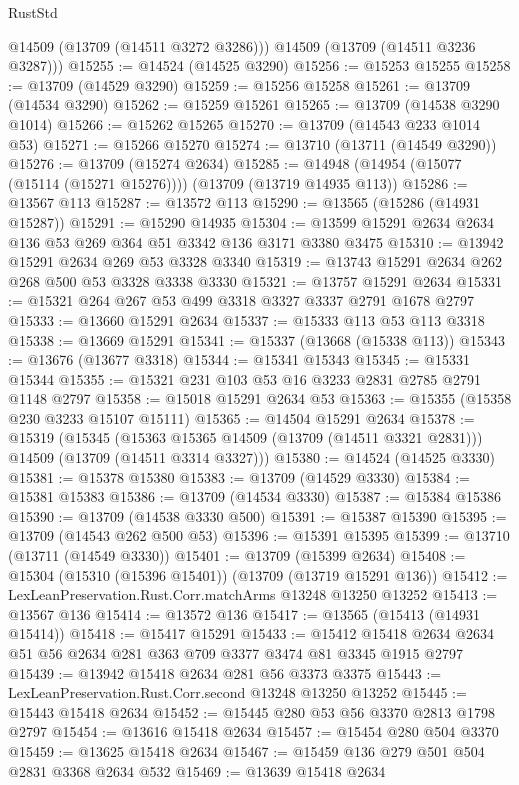 \begin{lexlean}{RustStd}
\begin{coremodule}
        @14509
        (@13709 (@14511 @3272 @3286)))
      @14509
      (@13709 (@14511 @3236 @3287)))
@15255 := @14524 (@14525 @3290)
@15256 := @15253 @15255
@15258 := @13709 (@14529 @3290)
@15259 := @15256 @15258
@15261 := @13709 (@14534 @3290)
@15262 := @15259 @15261
@15265 := @13709 (@14538 @3290 @1014)
@15266 := @15262 @15265
@15270 := @13709 (@14543 @233 @1014 @53)
@15271 := @15266 @15270
@15274 := @13710 (@13711 (@14549 @3290))
@15276 := @13709 (@15274 @2634)
@15285 := @14948 (@14954 (@15077 (@15114 (@15271 @15276)))) (@13709 (@13719 @14935 @113))
@15286 := @13567 @113
@15287 := @13572 @113
@15290 := @13565 (@15286 (@14931 @15287))
@15291 := @15290 @14935
@15304 := @13599 @15291 @2634 @2634 @136 @53 @269 @364 @51 @3342 @136 @3171 @3380 @3475
@15310 := @13942 @15291 @2634 @269 @53 @3328 @3340
@15319 := @13743 @15291 @2634 @262 @268 @500 @53 @3328 @3338 @3330
@15321 := @13757 @15291 @2634
@15331 := @15321 @264 @267 @53 @499 @3318 @3327 @3337 @2791 @1678 @2797
@15333 := @13660 @15291 @2634
@15337 := @15333 @113 @53 @113 @3318
@15338 := @13669 @15291
@15341 := @15337 (@13668 (@15338 @113))
@15343 := @13676 (@13677 @3318)
@15344 := @15341 @15343
@15345 := @15331 @15344
@15355 := @15321 @231 @103 @53 @16 @3233 @2831 @2785 @2791 @1148 @2797
@15358 := @15018 @15291 @2634 @53
@15363 := @15355 (@15358 @230 @3233 @15107 @15111)
@15365 := @14504 @15291 @2634
@15378 := @15319
    (@15345
      (@15363 @15365 @14509 (@13709 (@14511 @3321 @2831)))
      @14509
      (@13709 (@14511 @3314 @3327)))
@15380 := @14524 (@14525 @3330)
@15381 := @15378 @15380
@15383 := @13709 (@14529 @3330)
@15384 := @15381 @15383
@15386 := @13709 (@14534 @3330)
@15387 := @15384 @15386
@15390 := @13709 (@14538 @3330 @500)
@15391 := @15387 @15390
@15395 := @13709 (@14543 @262 @500 @53)
@15396 := @15391 @15395
@15399 := @13710 (@13711 (@14549 @3330))
@15401 := @13709 (@15399 @2634)
@15408 := @15304 (@15310 (@15396 @15401)) (@13709 (@13719 @15291 @136))
@15412 := LexLeanPreservation.Rust.Corr.matchArms @13248 @13250 @13252
@15413 := @13567 @136
@15414 := @13572 @136
@15417 := @13565 (@15413 (@14931 @15414))
@15418 := @15417 @15291
@15433 := @15412 @15418 @2634 @2634 @51 @56 @2634 @281 @363 @709 @3377 @3474 @81 @3345 @1915 @2797
@15439 := @13942 @15418 @2634 @281 @56 @3373 @3375
@15443 := LexLeanPreservation.Rust.Corr.second @13248 @13250 @13252
@15445 := @15443 @15418 @2634
@15452 := @15445 @280 @53 @56 @3370 @2813 @1798 @2797
@15454 := @13616 @15418 @2634
@15457 := @15454 @280 @504 @3370
@15459 := @13625 @15418 @2634
@15467 := @15459 @136 @279 @501 @504 @2831 @3368 @2634 @532
@15469 := @13639 @15418 @2634

\end{coremodule}
\end{lexlean}
